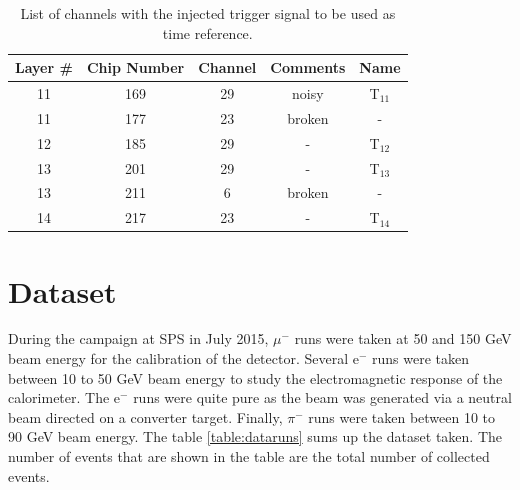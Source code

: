 \begin{table}[htb!]
	\centering
	\caption{List of channels with the injected trigger signal to be used as time reference.}
	\label{table:trigger_signal_list}
	\begin{tabular}{@{} ccccc @{}}
		\hline
		Layer \# & Chip Number & Channel & Comments & Name \\
		\hline
		11 & 169 & 29 & noisy & T$_{11}$ \\
		11 & 177 & 23 & broken & - \\
		12 & 185 & 29 & - & T$_{12}$ \\
		13 & 201 & 29 & -  & T$_{13}$ \\
		13 & 211 & 6 & broken & - \\
		14 & 217 & 23 & - & T$_{14}$ \\
		\hline
	\end{tabular}
\end{table}

\section{Dataset}
\label{subsec:dataset}

During the campaign at SPS in July 2015, $\mu^-$ runs were taken at 50 and 150 GeV beam energy for the calibration of the detector. Several e$^{-}$ runs were taken between 10 to 50 GeV beam energy to study the electromagnetic response of the calorimeter. The e$^{-}$ runs were quite pure as the beam was generated via a neutral beam directed on a converter target. %
Finally, $\pi^-$ runs were taken between 10 to 90 GeV beam energy. The table \ref{table:dataruns} sums up the dataset taken. The number of events that are shown in the table are the total number of collected events.

